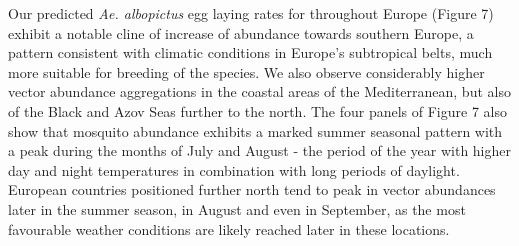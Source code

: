 \documentclass[preprint,12pt]{elsarticle}
\begin{document}
Our predicted \textit{Ae. albopictus} egg laying rates for throughout Europe (Figure 7) exhibit a notable cline of increase of abundance towards southern Europe, a pattern consistent with climatic conditions in Europe's subtropical belts, much more suitable for breeding of the species. We also observe considerably higher vector abundance aggregations in the coastal areas of the Mediterranean, but also of the Black and Azov Seas further to the north. The four panels of Figure 7 also show that mosquito abundance exhibits a marked summer seasonal pattern with a peak during the months of July and August - the period of the year with higher day and night temperatures in combination with long periods of daylight. European countries positioned further north tend to peak in vector abundances later in the summer season, in August and even in September, as the most favourable weather conditions are likely reached later in these locations. 
\end{document}
